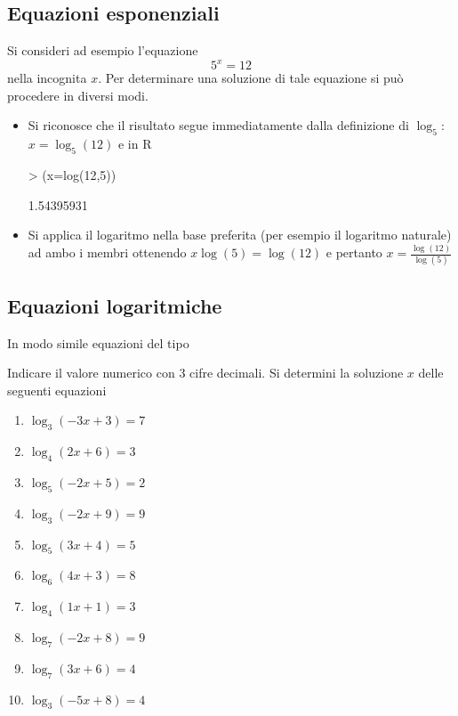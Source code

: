 \documentclass[onecolumn,11pt]{book}
\newcommand{\rpr}{\textsf{R}~}
\begin{document}
\subsection{Equazioni esponenziali} Si consideri ad esempio l'equazione
\[ 5^{x}=12\]
nella incognita $x$.
Per determinare una soluzione di tale equazione si pu\`o procedere in diversi modi.
\begin{itemize}
\item Si riconosce che il risultato segue immediatamente dalla definizione di $\log_5$: 
$x=\log_5(12)$
e in \rpr
\begin{Schunk}
\begin{Sinput}
> (x=log(12,5))
\end{Sinput}
\begin{Soutput}
[1] 1.54395931
\end{Soutput}
\end{Schunk}
\item Si applica il logaritmo nella base preferita (per esempio il logaritmo naturale)  ad ambo i membri ottenendo
$x\log(5)=\log(12)$ e pertanto $x=\frac{\log(12)}{\log(5)}$
\end{itemize}

\subsection{Equazioni logaritmiche}
In modo simile equazioni del tipo



Indicare il valore numerico con 3 cifre decimali. Si determini la soluzione $x$ delle seguenti equazioni
\begin{enumerate}
 \item  $\log_ 3 ( -3 x + 3 )= 7 $ \item  $\log_ 4 ( 2 x + 6 )= 3 $ \item  $\log_ 5 ( -2 x + 5 )= 2 $ \item  $\log_ 3 ( -2 x + 9 )= 9 $ \item  $\log_ 5 ( 3 x + 4 )= 5 $ \item  $\log_ 6 ( 4 x + 3 )= 8 $ \item  $\log_ 4 ( 1 x + 1 )= 3 $ \item  $\log_ 7 ( -2 x + 8 )= 9 $ \item  $\log_ 7 ( 3 x + 6 )= 4 $ \item  $\log_ 3 ( -5 x + 8 )= 4 $
\end{enumerate}
\end{document}
